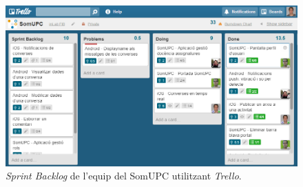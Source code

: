 \begin{figure}[ht]
    \centering
    \includegraphics*[scale=0.6]{GestioProjecte/Metodologia/sprint-backlog.png}
    \caption{\textit{Sprint Backlog} de l'equip del SomUPC utilitzant \textit{Trello}.}
    \label{fig:sprint-backlog}
\end{figure}
\FloatBarrier 
